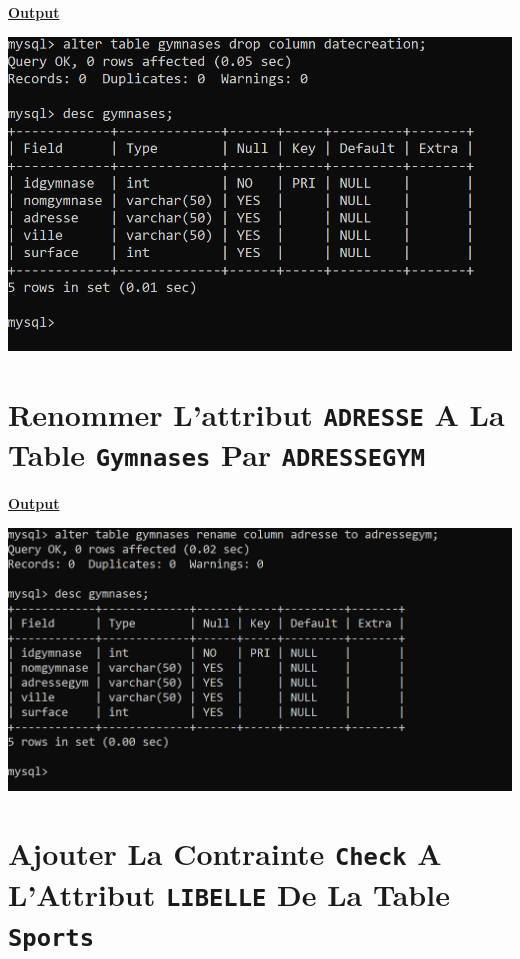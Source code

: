 \vspace{0.25cm}
\textbf{\underline{Output}}
\vspace{0.25cm}
\begin{center}
    \includegraphics[height=0.36\textheight]{Parties/Partie1/drop.PNG}
\end{center}

\newpage

\section{Renommer L'attribut \texttt{ADRESSE} A La Table \texttt{Gymnases} Par \texttt{ADRESSEGYM}}


\vspace{0.25cm}
\textbf{\underline{Output}}
\vspace{0.25cm}
\begin{center}
    \includegraphics[height=0.36\textheight]{Parties/Partie1/rename.PNG}
\end{center}


\vspace{1cm}

\section{Ajouter La Contrainte \texttt{Check} A L'Attribut \texttt{LIBELLE} De La Table \texttt{Sports}}




